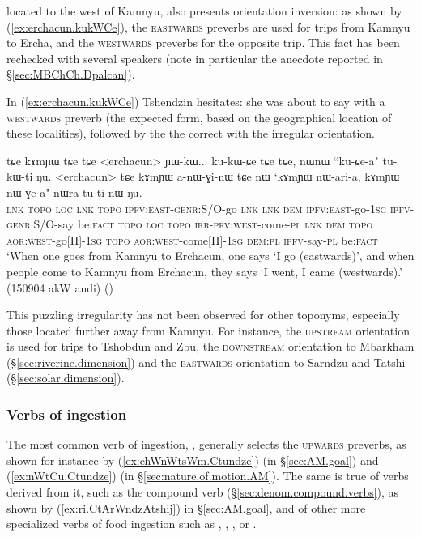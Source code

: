 located to the west of Kamnyu, also presents orientation inversion: as shown by (\ref{ex:erchacun.kukWCe}), the \textsc{eastwards} preverbs are used for trips from Kamnyu to Ercha, and the \textsc{westwards} preverbs for the opposite trip. This fact has been rechecked with several speakers (note in particular the anecdote reported in §\ref{sec:MBChCh.Dpalcan}).

In (\ref{ex:erchacun.kukWCe}) Tshendzin hesitates: she was about to say  with a \textsc{westwards} preverb (the expected form, based on the geographical location of these localities), followed by the the correct  with the irregular orientation.

\begin{exe}
\ex \label{ex:erchacun.kukWCe}
\gll tɕe kɤmɲɯ tɕe tɕe <erchacun> ɲɯ-kɯ... ku-kɯ-ɕe tɕe tɕe, nɯnɯ ``ku-ɕe-a" tu-kɯ-ti ŋu. <erchacun> tɕe kɤmɲɯ a-nɯ-ɣi-nɯ tɕe nɯ `kɤmɲɯ nɯ-ari-a, kɤmɲɯ nɯ-ɣe-a" nɯra tu-ti-nɯ ŋu. \\
\textsc{lnk}  \textsc{topo} \textsc{loc} \textsc{lnk}  \textsc{topo} { } \textsc{ipfv}:\textsc{east}-\textsc{genr}:S/O-go \textsc{lnk} \textsc{lnk} \textsc{dem} \textsc{ipfv}:\textsc{east}-go-\textsc{1sg} \textsc{ipfv}-\textsc{genr}:S/O-say be:\textsc{fact}  \textsc{topo} \textsc{loc}  \textsc{topo} \textsc{irr}-\textsc{pfv}:\textsc{west}-come-\textsc{pl} \textsc{lnk} \textsc{dem}  \textsc{topo} \textsc{aor}:\textsc{west}-go[II]-\textsc{1sg}  \textsc{topo} \textsc{aor}:\textsc{west}-come[II]-\textsc{1sg}  \textsc{dem}:\textsc{pl} \textsc{ipfv}-say-\textsc{pl} be:\textsc{fact} \\
\glt `When one goes from Kamnyu to Erchacun, one says `I go (eastwards)', and when people come to Kamnyu from Erchacun, they says `I went, I came (westwards).'
(150904 akW andi)
()
\end{exe}

This puzzling irregularity has not been observed for other toponyms, especially those located further away from Kamnyu. For instance, the \textsc{upstream} orientation is used for trips to Tshobdun and Zbu, the \textsc{downstream} orientation to Mbarkham (§\ref{sec:riverine.dimension}) and the \textsc{eastwards} orientation to Sarndzu and Tatshi (§\ref{sec:solar.dimension}).


\subsubsection{Verbs of ingestion} \label{sec:preverb.ingestion}
The most common verb of ingestion, , generally selects the \textsc{upwards} preverbs, as shown for instance by (\ref{ex:chWnWtsWm.Ctundze}) (in §\ref{sec:AM.goal}) and (\ref{ex:nWtCu.Ctundze}) (in §\ref{sec:nature.of.motion.AM}). The same is true of verbs derived from it, such as the compound verb  (§\ref{sec:denom.compound.verbs}), as shown by (\ref{ex:ri.CtArWndzAtshij}) in §\ref{sec:AM.goal}, and of other more specialized verbs of food ingestion such as , , ,  or .

